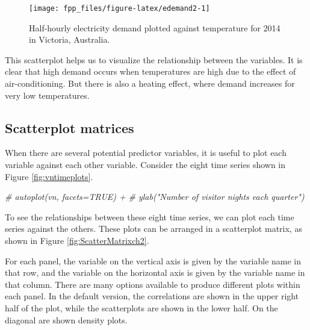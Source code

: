 \documentclass[]{book}
\newenvironment{Shaded}{\begin{snugshade}}{\end{snugshade}}
\newcommand{\CommentTok}[1]{\textcolor[rgb]{0.56,0.35,0.01}{\textit{#1}}}
\begin{document}
\begin{figure}

{\centering \texttt{[image: fpp\_files/figure-latex/edemand2-1]} 

}

\caption{Half-hourly electricity demand plotted against temperature for 2014 in Victoria, Australia.}\label{fig:edemand2}
\end{figure}

This scatterplot helps us to visualize the relationship between the variables. It is clear that high demand occurs when temperatures are high due to the effect of air-conditioning. But there is also a heating effect, where demand increases for very low temperatures.

\hypertarget{scatterplot-matrices}{%
\subsection*{Scatterplot matrices}\label{scatterplot-matrices}}

When there are several potential predictor variables, it is useful to plot each variable against each other variable. Consider the eight time series shown in Figure \ref{fig:vntimeplots}.

\begin{Shaded}
\begin{Highlighting}[]
\CommentTok{# autoplot(vn, facets=TRUE) +}
\CommentTok{#   ylab("Number of visitor nights each quarter")}
\end{Highlighting}
\end{Shaded}

To see the relationships between these eight time series, we can plot each time series against the others. These plots can be arranged in a scatterplot matrix, as shown in Figure \ref{fig:ScatterMatrixch2}.

\begin{Shaded}
\end{Shaded}

For each panel, the variable on the vertical axis is given by the variable name in that row, and the variable on the horizontal axis is given by the variable name in that column. There are many options available to produce different plots within each panel. In the default version, the correlations are shown in the upper right half of the plot, while the scatterplots are shown in the lower half. On the diagonal are shown density plots.
\end{document}

